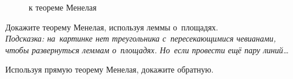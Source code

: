 \begin{figure}[h]
\begin{center}
    \caption{к теореме Менелая}
    \label{triangle-area-2:fig:menelaus-triangle}
\end{center}
\end{figure}

\begin{problems}

\item
Докажите теорему Менелая, используя леммы о~площадях.
\\
\emph{Подсказка: на~картинке нет треугольника с~пересекающимися чевианами,
чтобы развернуться леммам о~площадях.
Но~если провести ещё пару линий\ldots}

\item
Используя прямую теорему Менелая, докажите обратную.

\end{problems}

